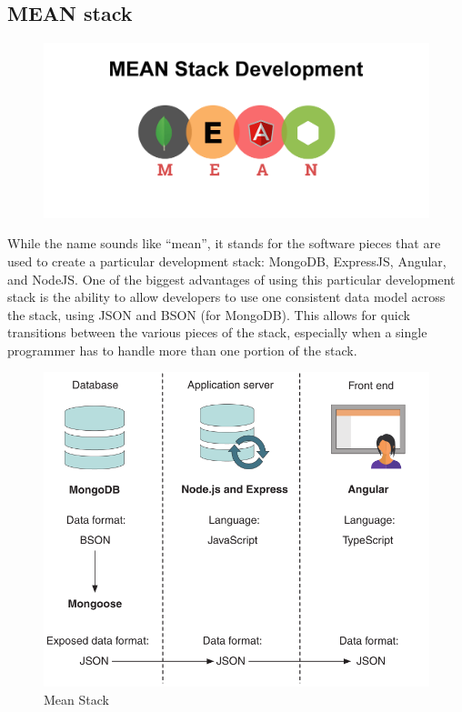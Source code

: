 \subsection*{MEAN stack}

\begin{figure}[!ht]
      \center
      \includegraphics[scale=0.30]{assets/meanstack.png}
\end{figure}

While the name sounds like “mean”, it stands for the software pieces that are used to create a particular development stack: MongoDB, ExpressJS, Angular, and NodeJS. One of the biggest advantages of using this particular development stack is the ability to allow developers to use one consistent data model across the stack, using \ac{JSON} and BSON (for MongoDB). This allows for quick transitions between the various pieces of the stack, especially when a single programmer has to handle more than one portion of the stack.

\begin{figure}[!ht]
      \center
      \includegraphics[scale=0.60]{assets/mean.png}
      \caption{Mean Stack}
      \label{fig:mean}
\end{figure}

